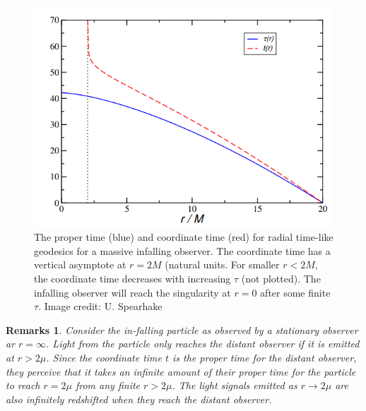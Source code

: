 \documentclass[a4paper]{article}
\newtheorem{remarks}{Remarks}[section]
\theoremstyle{new}
\begin{document}
\begin{figure}[H]
    \centering
    \includegraphics[scale=0.7]{radialtimelike.PNG}
    \caption{The proper time (blue) and coordinate time (red) for radial time-like geodesics for a massive infalling observer. The coordinate time has a vertical asymptote at $r=2M$ (natural units. For smaller $r<2M$, the coordinate time decreases with increasing $\tau$ (not plotted). The infalling observer will reach the singularity at $r=0$ after some finite $\tau$. Image credit: U. Spearhake}
\end{figure}
\begin{remarks}
Consider the in-falling particle as observed by a stationary observer ar $r=\infty$. Light from the particle only reaches the distant observer if it is emitted at $r>2\mu$. Since the coordinate time $t$ is the proper time for the distant observer, they perceive that it takes an infinite amount of their proper time for the particle to reach $r=2\mu$ from any finite $r>2\mu$. The light signals emitted as $r\rightarrow 2\mu$ are also infinitely redshifted when they reach the distant observer. 
\end{remarks}
\end{document}
